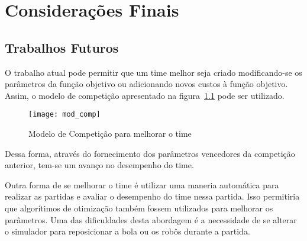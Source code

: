 \chapter{Considerações Finais}

\section{Trabalhos Futuros}

O trabalho atual pode permitir que um time melhor
seja criado modificando-se os parâmetros da função
objetivo ou adicionando novos custos à função objetivo.
Assim, o modelo de competição apresentado na
figura~\ref{fig:mod_comp} pode ser utilizado.

\begin{figure}[H]
  \centering
  \texttt{[image: mod\_comp]}
  \caption{Modelo de Competição para melhorar
           o time}\label{fig:mod_comp}
\end{figure}

Dessa forma, através do fornecimento dos parâmetros
vencedores da competição anterior, tem-se um avanço
no desempenho do time.

Outra forma de se melhorar o time é utilizar uma
maneria automática para realizar as partidas e
avaliar o desempenho do time nessa partida. Isso
permitiria que algorítimos de otimização também
fossem utilizados para melhorar os parâmetros.
Uma das dificuldades desta abordagem é a necessidade
de se alterar o simulador para reposicionar a bola
ou os robôs durante a partida.
 
%



